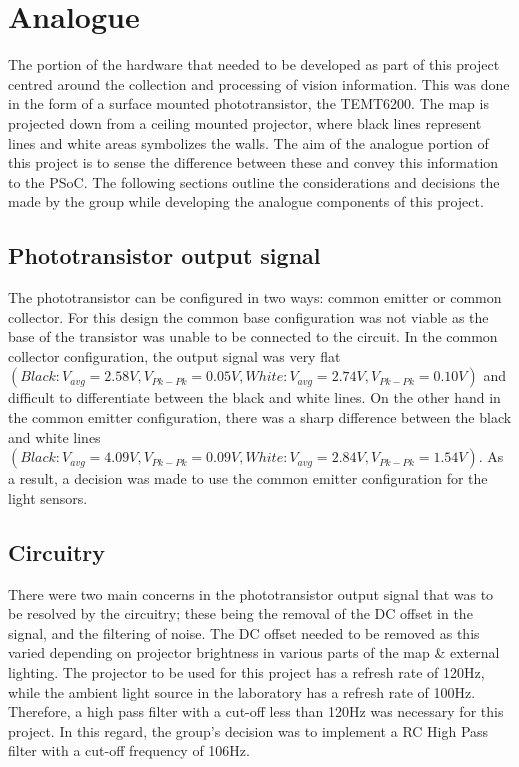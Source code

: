\documentclass{article}
\begin{document}

\section{Analogue}

The portion of the hardware that needed to be developed as part of this project centred around the collection and processing of vision information. This was done in the form of a surface mounted phototransistor, the TEMT6200. The map is projected down from a ceiling mounted projector, where black lines represent lines and white areas symbolizes the walls. The aim of the analogue portion of this project is to sense the difference between these and convey this information to the PSoC. The following sections outline the considerations and decisions the made by the group while developing the analogue components of this project.

\subsection{Phototransistor output signal}

The phototransistor can be configured in two ways: common emitter or common collector. For this design the common base configuration was not viable as the base of the transistor was unable to be connected to the circuit. In the common collector configuration, the output signal was very flat $(Black: V_{avg} = 2.58V, V_{Pk-Pk} = 0.05V, White: V_{avg} = 2.74V, V_{Pk-Pk} = 0.10V)$ and difficult to differentiate between the black and white lines. On the other hand in the common emitter configuration, there was a sharp difference between the black and white lines $(Black: V_{avg} = 4.09V, V_{Pk-Pk} = 0.09V, White: V_{avg} = 2.84V, V_{Pk-Pk} = 1.54V)$. As a result, a decision was made to use the common emitter configuration for the light sensors.
\subsection{Circuitry}

There were two main concerns in the phototransistor output signal that was to be resolved by the circuitry; these being the removal of the DC offset in the signal, and the filtering of noise. The DC offset needed to be removed as this varied depending on projector brightness in various parts of the map \& external lighting. The projector to be used for this project has a refresh rate of 120Hz, while the ambient light source in the laboratory has a refresh rate of 100Hz. Therefore, a high pass filter with a cut-off less than 120Hz was necessary for this project. In this regard, the group's decision was to implement a RC High Pass filter with a cut-off frequency of 106Hz.
\end{document}
